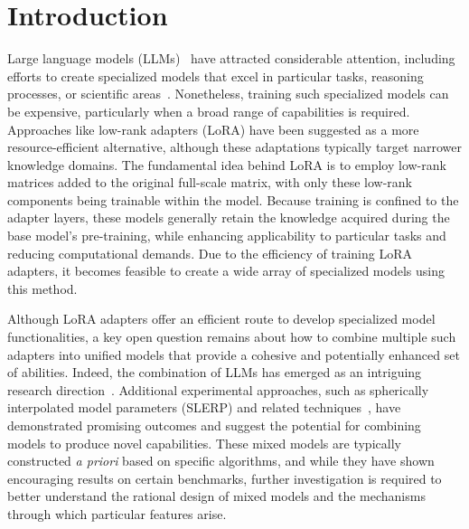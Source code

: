 \section{Introduction}
Large language models (LLMs)~\cite{Vaswani2017AttentionNeedc,Touvron2023LlamaModels,OpenAI2023GPT-4Report,Chowdhery2022PaLM:Pathways,Jiang2023Mistral7B,Gunasekar2023TextbooksNeed} have attracted considerable attention, including efforts to create specialized models that excel in particular tasks, reasoning processes, or scientific areas~\cite{Bubeck2023SparksGPT-4,Buehler2023MechGPTModalities,Nejjar2023LLMsAnalysis,Buehler2023GenerativeDesign,Luu2023BioinspiredLLM:Materials,Luu2023GenerativeSolvents,Buehler2023MeLMProblemsb,Ge2023OpenAGI:Experts}. Nonetheless, training such specialized models can be expensive, particularly when a broad range of capabilities is required. Approaches like low-rank adapters (LoRA) \cite{hu2021lora} have been suggested as a more resource-efficient alternative, although these adaptations typically target narrower knowledge domains. The fundamental idea behind LoRA is to employ low-rank matrices added to the original full-scale matrix, with only these low-rank components being trainable within the model. Because training is confined to the adapter layers, these models generally retain the knowledge acquired during the base model’s pre-training, while enhancing applicability to particular tasks and reducing computational demands. Due to the efficiency of training LoRA adapters, it becomes feasible to create a wide array of specialized models using this method.

Although LoRA adapters offer an efficient route to develop specialized model functionalities, a key open question remains about how to combine multiple such adapters into unified models that provide a cohesive and potentially enhanced set of abilities. Indeed, the combination of LLMs has emerged as an intriguing research direction~\cite{Kim2023SOLARUp-Scaling}. Additional experimental approaches, such as spherically interpolated model parameters (SLERP) and related techniques~\cite{Arcee-ai/mergekit:Models.}, have demonstrated promising outcomes and suggest the potential for combining models to produce novel capabilities. These mixed models are typically constructed {\it a priori} based on specific algorithms, and while they have shown encouraging results on certain benchmarks, further investigation is required to better understand the rational design of mixed models and the mechanisms through which particular features arise.

